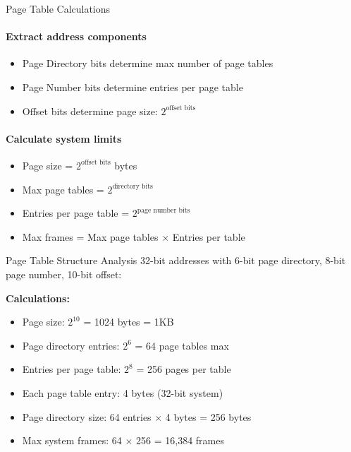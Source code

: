 \begin{KR}{Page Table Calculations}
    \paragraph{Extract address components}
    \begin{itemize}
        \item Page Directory bits determine max number of page tables
        \item Page Number bits determine entries per page table
        \item Offset bits determine page size: $2^{\text{offset bits}}$
    \end{itemize}
    
    \paragraph{Calculate system limits}
    \begin{itemize}
        \item Page size = $2^{\text{offset bits}}$ bytes
        \item Max page tables = $2^{\text{directory bits}}$
        \item Entries per page table = $2^{\text{page number bits}}$
        \item Max frames = Max page tables $\times$ Entries per table
    \end{itemize}
\end{KR}

\begin{example2}{Page Table Structure Analysis}
    32-bit addresses with 6-bit page directory, 8-bit page number, 10-bit offset:
    
    \tcblower
    
    \textbf{Calculations:}
    \begin{itemize}
        \item Page size: $2^{10}$ = 1024 bytes = 1KB
        \item Page directory entries: $2^6$ = 64 page tables max
        \item Entries per page table: $2^8$ = 256 pages per table
        \item Each page table entry: 4 bytes (32-bit system)
        \item Page directory size: 64 entries $\times$ 4 bytes = 256 bytes
        \item Max system frames: 64 $\times$ 256 = 16,384 frames
    \end{itemize}
\end{example2}

